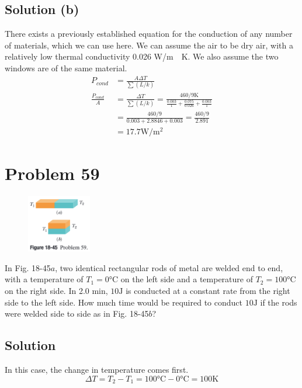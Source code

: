 \documentclass[12pt]{article}
\begin{document}
        \subsection{Solution (b)}
            There exists a previously established equation for the conduction of any number of materials, which we can use here.
            We can assume the air to be dry air, with a relatively low thermal conductivity 0.026 \unit{\watt/\meter\cdot\kelvin}.
            We also assume the two windows are of the same material.
            \begin{align}
                P_{cond}    &=  \frac{A\Delta T}{\sum(L/k)}\\
                \frac{P_{cond}}{A}  &=  \frac{\Delta T}{\sum(L/k)}
                    =   \frac{460/9 \unit{\kelvin}}{\frac{0.003}{1} + \frac{0.075}{0.026} + \frac{0.003}{1}}\\
                    &=  \frac{460/9}{0.003 + 2.8846 + 0.003}
                    =   \frac{460/9}{2.891}\\
                    &=  \boxed{17.7 \unit{\watt/\meter^2}}
            \end{align}

    \pagebreak
    \section{Problem 59}
        \begin{figure}
            \vspace{-30pt}
            \includegraphics[width=0.25\textwidth]{picture_18-45.png} 
        \end{figure}
        In Fig. 18-45$a$, two identical rectangular rods of metal are welded end to end, with a temperature of $T_1 = 0\unit{\celsius}$ on the left side and a temperature of $T_2 = 100\unit{\celsius}$ on the right side. 
        In 2.0 min, $10 \unit{\joule}$ is conducted at a constant rate from the right side to the left side.
        How much time would be required to conduct $10 \unit{\joule}$ if the rods were welded side to side as in Fig. 18-45$b$?

        \subsection{Solution}
            In this case, the change in temperature comes first.
            \begin{equation}
                \Delta T    =   T_2 - T_1
                    =   100 \unit{\celsius} - 0 \unit{\celsius}
                    =   100 \unit{\kelvin}
            \end{equation}
\end{document}
